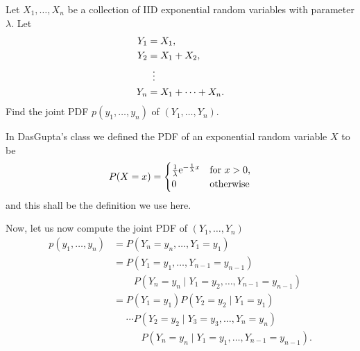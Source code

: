 \begin{problem}
  Let \(X_1,\dotsc,X_n\) be a collection of IID exponential random
  variables with parameter \(\lambda\). Let
  \begin{align*}
    Y_1&=X_1,\\
    Y_2&=X_1+X_2,\\
       &\vdotswithin{{}={}}\\
    Y_n&=X_1+\dotsb+X_n.
  \end{align*}
  Find the joint PDF \(p(y_1,\dotsc,y_n)\) of \((Y_1,\dotsc,Y_n)\).
\end{problem}
\begin{solution*}
  In DasGupta's class we defined the PDF of an exponential random variable
  \(X\) to be
  \[
    P(X=x)=
    \begin{cases}
      \tfrac{1}{\lambda}\mathrm{e}^{-\frac{1}{\lambda}x}&\text{for \(x>0\),}\\
      0&\text{otherwise}
    \end{cases}
  \]
  and this shall be the definition we use here.

  Now, let us now compute the joint PDF of \((Y_1,\dotsc,Y_n)\)
  \begin{equation}
    \label{eq:yip:mid-2:3}
    \begin{aligned}
      p(y_1,\dotsc,y_n)
      &=P(Y_n=y_n,\dotsc,Y_1=y_1)\\
      &=P(Y_1=y_1,\dotsc,Y_{n-1}=y_{n-1})\\
      &\phantom{{}={}\dotsm}
      P(Y_n=y_n\mid Y_1=y_2,\dotsc,Y_{n-1}=y_{n-1})\\
      &=P(Y_1=y_1)P(Y_2=y_2\mid Y_1=y_1)\\
      &\phantom{{}={}}\dotsm%
      P(Y_2=y_2\mid Y_3=y_3,\dotsc,Y_n=y_n)\\
      &\phantom{{}={}\dotsm\dotsm}P(Y_n=y_n\mid Y_1=y_1,\dotsc,Y_{n-1}=y_{n-1}).
    \end{aligned}
  \end{equation}


\end{solution*}
